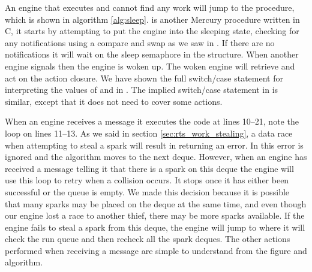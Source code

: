 
An engine that executes \idle and cannot find any work will jump to the
\sleep procedure,
which is shown in algorithm \ref{alg:sleep}.
\sleep is another Mercury procedure written in C,
it starts by attempting to put the engine into the sleeping state,
checking for any notifications using a compare and swap as we saw in \idle.
If there are no notifications it will wait on the sleep semaphore in the
\enginesleepsync structure.
When another engine signals  then the engine is woken up.
The woken engine will retrieve and act on the action closure.
We have shown the full switch/case statement for interpreting the values of
 and  in \sleep.
The implied switch/case statement in \idle is similar,
except that it does not need to cover some actions.

When an engine receives a  message it executes the
code at lines 10--21,
note the loop on lines 11--13.
As we said in section \ref{sec:rts_work_stealing},
a data race when attempting to steal a spark will result in
\steal returning an error.
In \trystealspark this error is ignored and the algorithm moves to the next
deque.
However,
when an engine has received a message telling it that there is a spark on
this deque the engine will use this loop to retry when a collision occurs.
It stops once it has either been successful or the queue is empty.
We made this decision because it is possible that many sparks may be placed
on the deque at the same time,
and even though our engine lost a race to another thief, there may be more
sparks available.
If the engine fails to steal a spark from this deque,
the engine will jump to \idle where it will check the run queue and then
recheck all the spark deques.
The other actions performed when receiving a message are simple to
understand from the figure and algorithm.

